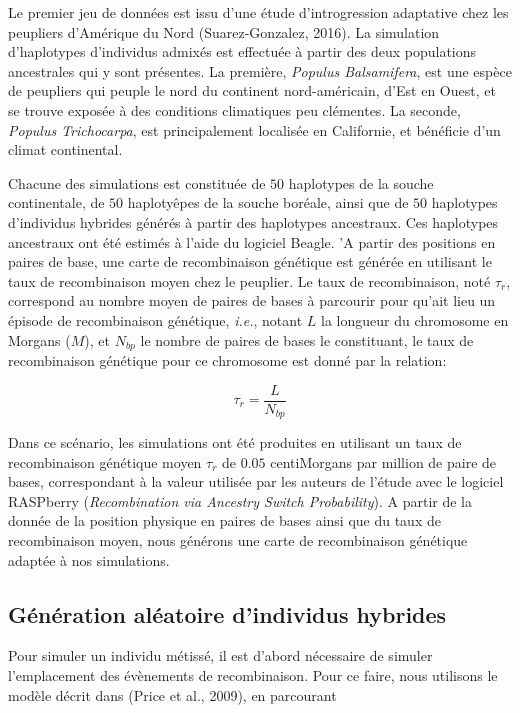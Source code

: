 \documentclass[12pt,twoside]{reedthesis}
\theoremstyle{definition}
\theoremstyle{definition}
\theoremstyle{remark}
\begin{document}
  Le premier jeu de données est issu d'une étude d'introgression
  adaptative chez les peupliers d'Amérique du Nord (Suarez-Gonzalez,
  2016). La simulation d'haplotypes d'individus admixés est effectuée à
  partir des deux populations ancestrales qui y sont présentes. La
  première, \emph{Populus Balsamifera}, est une espèce de peupliers qui
  peuple le nord du continent nord-américain, d'Est en Ouest, et se trouve
  exposée à des conditions climatiques peu clémentes. La seconde,
  \emph{Populus Trichocarpa}, est principalement localisée en Californie,
  et bénéficie d'un climat continental.
  
  Chacune des simulations est constituée de \(50\) haplotypes de la souche
  continentale, de \(50\) haplotyêpes de la souche boréale, ainsi que de
  \(50\) haplotypes d'individus hybrides générés à partir des haplotypes
  ancestraux. Ces haplotypes ancestraux ont été estimés à l'aide du
  logiciel Beagle. 'A partir des positions en paires de base, une carte de
  recombinaison génétique est générée en utilisant le taux de
  recombinaison moyen chez le peuplier. Le taux de recombinaison, noté
  \(\tau_r\), correspond au nombre moyen de paires de bases à parcourir
  pour qu'ait lieu un épisode de recombinaison génétique, \emph{i.e.},
  notant \(L\) la longueur du chromosome en Morgans (\(M\)), et \(N_{bp}\)
  le nombre de paires de bases le constituant, le taux de recombinaison
  génétique pour ce chromosome est donné par la relation:
  
  \[\tau_r = \frac{L}{N_{bp}}\]
  
  Dans ce scénario, les simulations ont été produites en utilisant un taux
  de recombinaison génétique moyen \(\tau_r\) de \(0.05\) centiMorgans par
  million de paire de bases, correspondant à la valeur utilisée par les
  auteurs de l'étude avec le logiciel RASPberry
  (\textit{Recombination via Ancestry Switch Probability}). A partir de la
  donnée de la position physique en paires de bases ainsi que du taux de
  recombinaison moyen, nous générons une carte de recombinaison génétique
  adaptée à nos simulations.
  
  \subsection{Génération aléatoire d'individus
  hybrides}\label{generation-aleatoire-dindividus-hybrides}
  
  Pour simuler un individu métissé, il est d'abord nécessaire de simuler
  l'emplacement des évènements de recombinaison. Pour ce faire, nous
  utilisons le modèle décrit dans (Price et al., 2009), en parcourant
  
\end{document}

